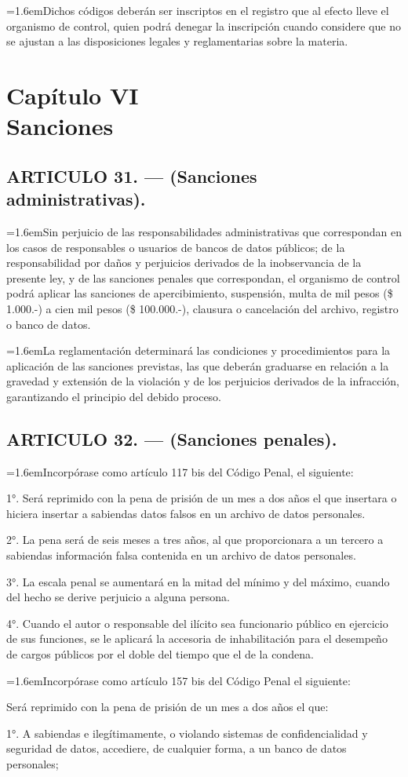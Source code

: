 \documentclass[10pt,a4paper]{article}
\newcommand{\capitulo}[2]{\section[#1 --- #2]{#1\\[2pt]#2}}
\newcommand{\articulo}[1]{\subsection{#1}}
\newcommand{\inciso}[2]{\par{\hangindent=1.6em\hangafter=1\makebox[1.6em][l]{#1}#2\par}}
\begin{document}
\inciso{2.}{Dichos códigos deberán ser inscriptos en el registro que al efecto lleve el organismo de control, quien podrá denegar la inscripción cuando considere que no se ajustan a las disposiciones legales y reglamentarias sobre la materia.}

\capitulo{Capítulo VI}{Sanciones}
\articulo{ARTICULO 31. — (Sanciones administrativas).}
\inciso{1.}{Sin perjuicio de las responsabilidades administrativas que correspondan en los casos de responsables o usuarios de bancos de datos públicos; de la responsabilidad por daños y perjuicios derivados de la inobservancia de la presente ley, y de las sanciones penales que correspondan, el organismo de control podrá aplicar las sanciones de apercibimiento, suspensión, multa de mil pesos (\$ 1.000.-) a cien mil pesos (\$ 100.000.-), clausura o cancelación del archivo, registro o banco de datos.}

\inciso{2.}{La reglamentación determinará las condiciones y procedimientos para la aplicación de las sanciones previstas, las que deberán graduarse en relación a la gravedad y extensión de la violación y de los perjuicios derivados de la infracción, garantizando el principio del debido proceso.}

\articulo{ARTICULO 32. — (Sanciones penales).}
\inciso{1.}{Incorpórase como artículo 117 bis del Código Penal, el siguiente:}

\textquotesingle{}1°. Será reprimido con la pena de prisión de un mes a dos años el que insertara o hiciera insertar a sabiendas datos falsos en un archivo de datos personales.

2°. La pena será de seis meses a tres años, al que proporcionara a un tercero a sabiendas información falsa contenida en un archivo de datos personales.

3°. La escala penal se aumentará en la mitad del mínimo y del máximo, cuando del hecho se derive perjuicio a alguna persona.

4°. Cuando el autor o responsable del ilícito sea funcionario público en ejercicio de sus funciones, se le aplicará la accesoria de inhabilitación para el desempeño de cargos públicos por el doble del tiempo que el de la condena\textquotesingle{}.

\inciso{2.}{Incorpórase como artículo 157 bis del Código Penal el siguiente:}

\textquotesingle{}Será reprimido con la pena de prisión de un mes a dos años el que:

1°. A sabiendas e ilegítimamente, o violando sistemas de confidencialidad y seguridad de datos, accediere, de cualquier forma, a un banco de datos personales;
\end{document}
